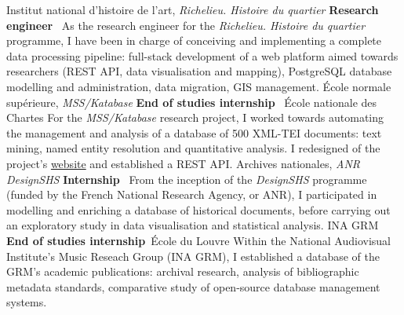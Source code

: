 	{%
		Institut national d'histoire de l'art, \textit{Richelieu. Histoire du quartier}}
	{%
		\textbf{Research engineer}~}
	{%
		As the research engineer for the \textit{Richelieu. Histoire du quartier} programme, I have been in charge of conceiving and implementing a complete data processing pipeline: full-stack development of a web platform aimed towards researchers (REST API, data visualisation and mapping), PostgreSQL database modelling and administration, data migration, GIS management.}
	{%
		École normale supérieure, \textit{MSS/Katabase}}
	{%
		\textbf{End of studies internship}~ École nationale des Chartes}
	{%
		For the \textit{MSS/Katabase} research project, I worked towards automating the management and analysis of a database of 500 XML-TEI documents: text mining, named entity resolution and quantitative analysis. I redesigned of the project's \href{https://katabase.huma-num.fr/}{website} and established a REST API.}
	{%
		Archives nationales, \textit{ANR DesignSHS}}
	{%
		\textbf{Internship}~}
	{%
		From the inception of the \textit{DesignSHS} programme (funded by the French National Research Agency, or ANR), I participated in modelling and enriching a database of historical documents, before carrying out an exploratory study in data visualisation and statistical analysis.}
	{%
		INA GRM}
	{%
		\textbf{End of studies internship}~École du Louvre}
	{%
		Within the National Audiovisual Institute's Music Reseach Group (INA GRM), I established a database of the GRM's academic publications: archival research, analysis of bibliographic metadata standards, comparative study of open-source database management systems.}
